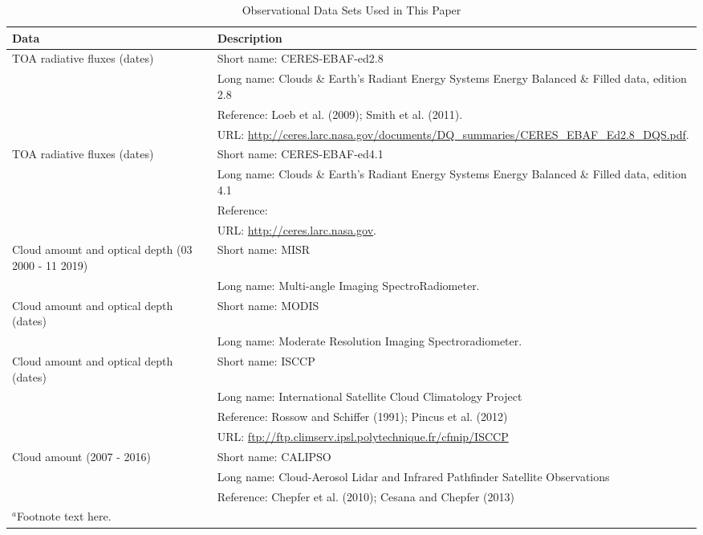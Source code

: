 \documentclass[draft]{agujournal2019}
\begin{document}
 \begin{sidewaystable}
 \caption{ Observational Data Sets Used in This Paper}
 \centering
 \begin{tabular}{l l}
 \hline
 Data  & Description  \\
 \hline
   TOA radiative fluxes (dates)  & Short name: CERES-EBAF-ed2.8   \\
                                     & Long name: Clouds \& Earth's Radiant Energy Systems Energy Balanced \& Filled data, edition 2.8  \\
                                     & Reference: Loeb et al. (2009); Smith et al. (2011).  \\
                                     & URL: \url{http://ceres.larc.nasa.gov/documents/DQ_summaries/CERES_EBAF_Ed2.8_DQS.pdf}.   \\
   TOA radiative fluxes (dates)  & Short name: CERES-EBAF-ed4.1   \\
                                     & Long name: Clouds \& Earth's Radiant Energy Systems Energy Balanced \& Filled data, edition 4.1  \\
                                     & Reference:   \\
                                     & URL: \url{http://ceres.larc.nasa.gov}.   \\
   Cloud amount and optical depth (03 2000 - 11 2019) & Short name:  MISR   \\
                                                                   &  Long name: Multi-angle Imaging SpectroRadiometer.  \\
   Cloud amount and optical depth (dates)  & Short name: MODIS  \\
                                                                   & Long name: Moderate Resolution Imaging Spectroradiometer.  \\
   Cloud amount and optical depth (dates)  & Short name: ISCCP   \\
                                                                   & Long name: International Satellite Cloud Climatology Project   \\
                                                                   & Reference: Rossow and Schiffer (1991); Pincus et al. (2012)   \\
                                                                   & URL: \url{ftp://ftp.climserv.ipsl.polytechnique.fr/cfmip/ISCCP}     \\
   Cloud amount (2007 - 2016)  & Short name: CALIPSO   \\
                           & Long name: Cloud-Aerosol Lidar and Infrared Pathfinder Satellite Observations   \\
                           & Reference: Chepfer et al. (2010); Cesana and Chepfer (2013)      \\
    \hline
 \multicolumn{2}{l}{$^{a}$Footnote text here.}
 \label{tab:obs}
 \end{tabular}
 \end{sidewaystable}
 
\end{document}
